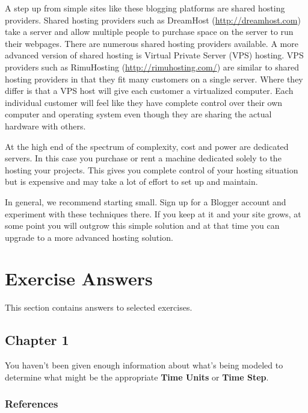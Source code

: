 \documentclass[]{memoir}
\renewcommand{\u}[1]{\textbf{#1}}
\begin{document}
A step up from simple sites like these blogging platforms are shared
hosting providers. Shared hosting providers such as DreamHost
(\url{http://dreamhost.com}) take a server and allow multiple people to
purchase space on the server to run their webpages. There are numerous
shared hosting providers available. A more advanced version of shared
hosting is Virtual Private Server (VPS) hosting. VPS providers such as
RimuHosting (\url{http://rimuhosting.com/}) are similar to shared
hosting providers in that they fit many customers on a single server.
Where they differ is that a VPS host will give each customer a
virtualized computer. Each individual customer will feel like they have
complete control over their own computer and operating system even
though they are sharing the actual hardware with others.

At the high end of the spectrum of complexity, cost and power are
dedicated servers. In this case you purchase or rent a machine dedicated
solely to the hosting your projects. This gives you complete control of
your hosting situation but is expensive and may take a lot of effort to
set up and maintain.

In general, we recommend starting small. Sign up for a Blogger account
and experiment with these techniques there. If you keep at it and your
site grows, at some point you will outgrow this simple solution and at
that time you can upgrade to a more advanced hosting solution.

\chapter{Exercise Answers}

This section contains answers to selected exercises.

\section{Chapter 1}


You haven't been given enough information about what's being modeled to
determine what might be the appropriate \u{Time Units} or \u{Time Step}.

\subsection{References}
\end{document}

